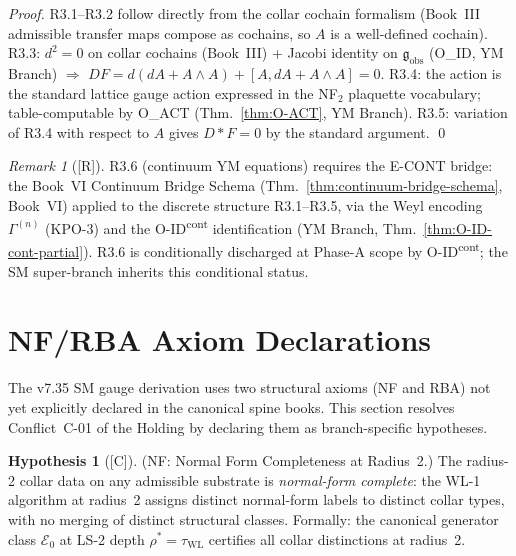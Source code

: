 \documentclass[12pt,oneside]{amsbook}
\theoremstyle{plain}
\theoremstyle{definition}
\newtheorem{hypothesis}[theorem]{Hypothesis}
\theoremstyle{remark}
\newtheorem{remark}[theorem]{Remark}
\newcommand{\status}[1]{\textup{[#1]}}
\begin{document}
\begin{proof}
R3.1--R3.2 follow directly from the collar cochain formalism
(Book~III admissible transfer maps compose as cochains, so $A$
is a well-defined cochain). R3.3: $d^2 = 0$ on collar cochains
(Book~III) + Jacobi identity on $\mathfrak{g}_{\mathrm{obs}}$
(O\_ID, YM Branch) $\Rightarrow$ $DF = d(dA + A \wedge A) +
[A, dA + A \wedge A] = 0$. R3.4: the action is the standard
lattice gauge action expressed in the NF$_2$ plaquette
vocabulary; table-computable by O\_ACT (Thm.~\ref{thm:O-ACT},
YM Branch). R3.5: variation of R3.4 with respect to $A$ gives
$D{*}F = 0$ by the standard argument. \qed
\end{proof}

\begin{remark}[\status{R}]
R3.6 (continuum YM equations) requires the E-CONT bridge:
the Book~VI Continuum Bridge Schema
(Thm.~\ref{thm:continuum-bridge-schema}, Book~VI) applied to
the discrete structure R3.1--R3.5, via the Weyl encoding
$\Gamma^{(n)}$ (KPO-3) and the O-ID\textsuperscript{cont}
identification (YM Branch, Thm.~\ref{thm:O-ID-cont-partial}).
R3.6 is conditionally discharged at Phase-A scope by
O-ID\textsuperscript{cont}; the SM super-branch inherits this
conditional status.
\end{remark}

\section{NF/RBA Axiom Declarations}
\label{sec:sm-nf-rba}

The v7.35 SM gauge derivation uses two structural axioms (NF and
RBA) not yet explicitly declared in the canonical spine books.
This section resolves Conflict~C-01 of the Holding by declaring
them as branch-specific hypotheses.

\begin{hypothesis}[\status{C}]\label{hyp:NF}
\textup{(NF: Normal Form Completeness at Radius~2.)}
The radius-2 collar data on any admissible substrate is
\emph{normal-form complete}: the WL-1 algorithm at radius~2
assigns distinct normal-form labels to distinct collar types,
with no merging of distinct structural classes. Formally:
the canonical generator class $\mathcal{E}_0$ at LS-2 depth
$\rho^* = \tau_{\mathrm{WL}}$ certifies all collar distinctions
at radius~2.
\end{hypothesis}
\end{document}
